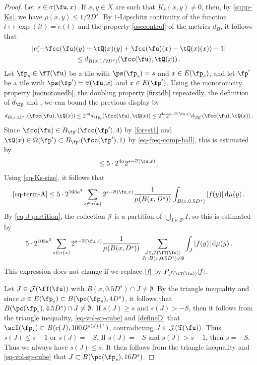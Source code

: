 \begin{proof}
    \leanok
    Let $s \in \sigma(\fu,x)$.
    If $x, y \in X$ are such that $K_s(x,y)\neq 0$, then, by \eqref{supp-Ks}, we have $\rho(x,y)\leq 1/2 D^s$. By $1$-Lipschitz continuity of the function $t \mapsto \exp(it) = e(t)$ and the property \eqref{osccontrol} of the metrics $d_B$, it follows that
    \begin{multline*}
        |e(-\fcc(\fu)(y)+\tQ(x)(y)+\fcc(\fu)(x)-\tQ(x)(x))-1|\\
        \leq d_{B(x, 1/2 D^{s})}(\fcc(\fu), \tQ(x))\,.
    \end{multline*}
    Let $\fp_s \in \fT(\fu)$ be a tile with $\ps(\fp_s) = s$ and $x \in E(\fp_s)$, and let $\fp'$ be a tile with $\ps(\fp') = \overline{\sigma}(\fu, x)$ and $x \in E(\fp')$.
    Using the monotonicity property \eqref{monotonedb}, the doubling property \eqref{firstdb} repeatedly, the definition of $d_{\fp}$ and , we can bound the previous display by
    $$
        d_{B(x, 4 D^{s})}(\fcc(\fu), \tQ(x)) \leq 2^{4a} d_{\fp_s}(\fcc(\fu), \tQ(x)) \le 2^{4a} 2^{s - \overline{\sigma}(\fu, x)} d_{\fp'}(\fcc(\fu), \tQ(x))\,.
    $$
    Since $\fcc(\fu) \in B_{\fp'}(\fcc(\fp'), 4)$ by \eqref{forest1} and $\tQ(x) \in \Omega(\fp') \subset B_{\fp'}(\fcc(\fp'), 1)$ by \eqref{eq-freq-comp-ball}, this is estimated by
    $$
        \le 5 \cdot 2^{4a} 2^{s - \overline{\sigma}(\fu, x)} \,.
    $$
    Using \eqref{eq-Ks-size}, it follows that
    $$
        \eqref{eq-term-A} \le 5\cdot 2^{103a^3} \sum_{s\in\sigma(x)}2^{s - \overline{\sigma}(\fu, x)} \frac{1}{\mu(B(x,D^s))}\int_{B(x,0.5D^{s})}|f(y)|\,\mathrm{d}\mu(y)\,.
    $$
    By \eqref{eq-J-partition}, the collection $\mathcal{J}$ is a partition of $\bigcup_{I \in \mathcal{D}} I$, so this is estimated by
    $$
         5\cdot 2^{103a^3} \sum_{s\in\sigma(x)}2^{s - \overline{\sigma}(\fu, x)} \frac{1}{\mu(B(x,D^s))}\sum_{\substack{J \in \mathcal{J}(\fT(\fu))\\J \cap B(x, 0.5D^s) \ne \emptyset} }\int_{J}|f(y)|\,\mathrm{d}\mu(y)\,.
    $$
    This expression does not change if we replace $|f|$ by $P_{\mathcal{J}(\fT(\fu))}|f|$.

    Let $J \in \mathcal{J}(\fT(\fu))$ with $B(x, 0.5 D^s) \cap J \ne \emptyset$. By the triangle inequality and since $x \in E(\fp_s) \subset B(\pc(\fp_s), 4D^{s})$, it follows that $B(\pc(\fp_s), 4.5D^s) \cap J \ne \emptyset$. If $s(J) \ge s$ and $s(J) > -S$, then it follows from the triangle inequality, \eqref{eq-vol-sp-cube} and \eqref{defineD} that $\scI(\fp_s) \subset B(c(J), 100 D^{s(J)+1})$, contradicting $J \in \mathcal{J}(\mathfrak{T}(\fu))$. Thus $s(J) \le s - 1$ or $s(J) = -S$. If $s(J) = -S$ and $s(J) > s - 1$, then $s = -S$. Thus we always have $s(J) \le s$. It then follows from the triangle inequality and \eqref{eq-vol-sp-cube} that $J \subset B(\pc(\fp_s), 16 D^s)$.


\end{proof}
